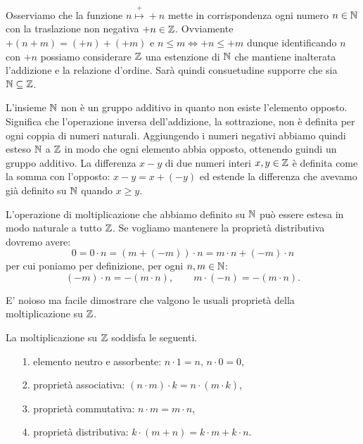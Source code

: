 
  Osserviamo che la funzione $n\stackrel+\mapsto +n$ mette in corrispondenza 
  ogni numero $n\in {\mathbb N}$ con la traslazione non negativa $+n\in {\mathbb Z}$.
  Ovviamente $+(n+m) = (+n)+(+m)$ e $n\le m \iff +n \le +m$
  dunque identificando $n$ con $+n$ possiamo considerare ${\mathbb Z}$ una
  estenzione di ${\mathbb N}$ che mantiene inalterata l'addizione e la relazione d'ordine.
  Sarà quindi consuetudine supporre che sia ${\mathbb N}\subseteq {\mathbb Z}$.

  L'insieme ${\mathbb N}$ non è un gruppo additivo in quanto non esiste l'elemento opposto.
  Significa che l'operazione inversa dell'addizione, la sottrazione, non è definita
  per ogni coppia di numeri naturali. 
  Aggiungendo i numeri negativi abbiamo quindi esteso ${\mathbb N}$ a ${\mathbb Z}$ in modo che 
  ogni elemento abbia opposto, ottenendo guindi un gruppo additivo.
  La differenza $x-y$ di due numeri interi $x,y\in {\mathbb Z}$ è definita come la somma 
  con l'opposto: $x-y = x + (-y)$ ed estende la differenza che avevamo già 
  definito su ${\mathbb N}$ quando $x\ge y$.

  L'operazione di moltiplicazione che abbiamo definito su ${\mathbb N}$ può essere 
  estesa in modo naturale a tutto ${\mathbb Z}$. 
  Se vogliamo mantenere la proprietà distributiva dovremo avere:
  \[
    0 = 0 \cdot n = (m+(-m))\cdot n = m\cdot n + (-m)\cdot n
  \]
  per cui poniamo per definizione, per ogni $n,m\in {\mathbb N}$:
  \[
    (-m) \cdot n = -(m\cdot n), \qquad  m \cdot (-n) = -(m\cdot n).
  \]

  E' noioso ma facile dimostrare che valgono le usuali proprietà della
  moltiplicazione su ${\mathbb Z}$.

  \begin{theorem}
    La moltiplicazione su ${\mathbb Z}$ soddisfa le seguenti.
    \begin{enumerate}
      \item[1.] elemento neutro e assorbente: $n\cdot 1 = n$, $n\cdot 0 = 0$,
      \item[2.] proprietà associativa: $(n\cdot m)\cdot k = n \cdot (m\cdot k)$,
      \item[3.] proprietà commutativa: $n\cdot m = m\cdot n$,
      \item[4.] proprietà distributiva: $k\cdot(m+n) = k\cdot m + k\cdot n$. 
    \end{enumerate}
  \end{theorem}

